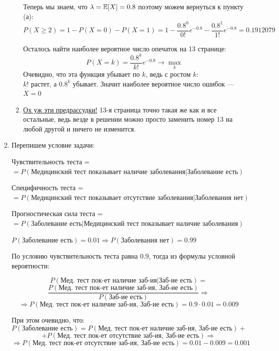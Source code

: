 \documentclass[12pt, a4paper]{article}\usepackage[]{graphicx}\usepackage[]{color}
\begin{document}
\begin{enumerate}
\begin{enumerate}
Теперь мы знаем, что $\lambda = \mathbb{E}[X] = 0.8$ поэтому можем вернуться к пункту (а):
\[
P(X \geqslant 2) = 1 - P(X=0) - P(X=1)  = 1 - \frac{0.8^0}{0!}e^{-0.8} - \frac{0.8^1}{1!}e^{-0.8} = 0.1912079
\] \vspace{-1.2cm}

\hspace{13cm} 

Осталось найти наиболее вероятное число опечаток на 13 странице:
\[
P(X=k) = \frac{0.8^k}{k!}e^{-0.8} \rightarrow \max \limits_k
\]
Очевидно, что эта функция убывает по $k$, ведь с ростом $k$:\\
 $k!$ растет, а $0.8^k$ убывает. Значит наиболее вероятное число ошибок — $X = 0$


\item \href{https://en.wikipedia.org/wiki/Triskaidekaphobia}{Ох уж эти предрассудки!} 13-я страница точно такая же как и все остальные, ведь везде в решении можно просто заменить номер 13 на любой другой и ничего не изменится.

\end{enumerate}

\item
Перепишем условие задачи:

Чувствительность теста = \\$=P(\text{Медицинский тест показывает наличие заболевания} | \text{Заболевание есть})$

Специфичность теста = \\$=P(\text{Медицинский тест показывает отсутствие заболевания} | \text{Заболевания нет})$

Прогностическая сила теста = \\$=P(\text{Заболевание есть} | \text{Медицинский тест показывает наличие заболевания})$

$P(\text{Заболевание есть}) = 0.01 \Rightarrow P(\text{Заболевания нет}) = 0.99 $

По условию чувствительность теста равна 0.9, тогда из формулы условной вероятности:

\[P(\text{Мед. тест пок-ет наличие заб-ия} | \text{Заб-ие есть}) = \]
\[\dfrac{P(\text{Мед. тест пок-ет наличие заб-ия, Заб-ие есть})}{P(\text{Заб-ие есть})} \Rightarrow\]
\[\Rightarrow P(\text{Мед. тест пок-ет наличие заб-ия, Заб-ие есть}) = 0.9 \cdot 0.01 = 0.009\]

При этом очевидно, что:
\[P(\text{Заболевание есть}) = P(\text{Мед. тест пок-ет наличие заб-ия, Заб-ие есть}) + \]
\[+ P(\text{Мед. тест пок-ет отсутствие заб-ия, Заб-ие есть}) \Rightarrow\]
\[\Rightarrow P(\text{Мед. тест пок-ет отсутствие заб-ия, Заб-ие есть}) = 0.01 - 0.009 = 0.001\]


\end{enumerate}
\end{document}
